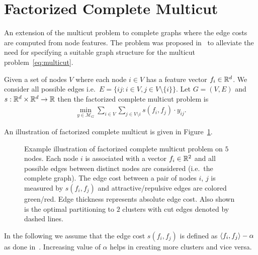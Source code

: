 \section{Factorized Complete Multicut}
\label{sec:complete_multicut}
An extension of the multicut problem to complete graphs where the edge costs are computed from node features. The problem was proposed in~\cite{aabbas23_clusterfug} to alleviate the need for specifying a suitable graph structure for the multicut problem~\eqref{eq:multicut}. 
\begin{definition}
    Given a set of nodes $V$ where each node $i \in V$ has a feature vector $f_i \in \mathbb{R}^d$. We consider all possible edges i.e.\ $E = \{ij : i \in V, j \in V\setminus \{i\} \}$. 
    Let $G = (V, E)$ and $s: \mathbb{R}^d \times \mathbb{R}^d \rightarrow \mathbb{R}$ then the factorized complete multicut problem is
    \begin{equation}
        \label{eq:factorized_complete_multicut}
        \begin{array}{rl}
            \min_{y \in \mathcal{M}_G} \sum\limits_{i \in V} \sum\limits_{j \in V \setminus i} s(f_i, f_j) \cdot y_{ij}.
        \end{array}
    \end{equation}
\end{definition}

An illustration of factorized complete multicut is given in Figure~\ref{fig:factorized-complete-multicut}.

\begin{figure}[H]
    \begin{center}
    \scalebox{1.5}{}
    \end{center}
    \caption{Example illustration of factorized complete multicut problem on $5$ nodes. Each node $i$ is associated with a vector $f_i \in \mathbb{R}^2$ and all possible edges between distinct nodes are considered (i.e.\ the complete graph). The edge cost between a pair of nodes $i$, $j$ is measured by $s(f_i, f_j)$ and attractive/repulsive edges are colored green/red. Edge thickness represents absolute edge cost. Also shown is the optimal partitioning to $2$ clusters with cut edges denoted by dashed lines.}    
    \label{fig:factorized-complete-multicut}
\end{figure}
In the following we assume that the edge cost $s(f_i, f_j)$ is defined as $\langle f_i, f_j \rangle - \alpha$ as done in~\cite{aabbas23_clusterfug}. Increasing value of $\alpha$ helps in creating more clusters and vice versa.

